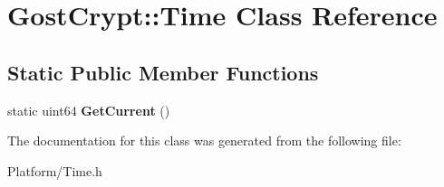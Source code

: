 \hypertarget{class_gost_crypt_1_1_time}{}\section{Gost\+Crypt\+:\+:Time Class Reference}
\label{class_gost_crypt_1_1_time}
\subsection*{Static Public Member Functions}
\begin{DoxyCompactItemize}
\item 
\mbox{\label{class_gost_crypt_1_1_time_a23d9e96d5a3b678300a6ccf0ab205a47}} 
static uint64 {\bfseries Get\+Current} ()
\end{DoxyCompactItemize}


The documentation for this class was generated from the following file\+:\begin{DoxyCompactItemize}
\item 
Platform/Time.\+h\end{DoxyCompactItemize}
